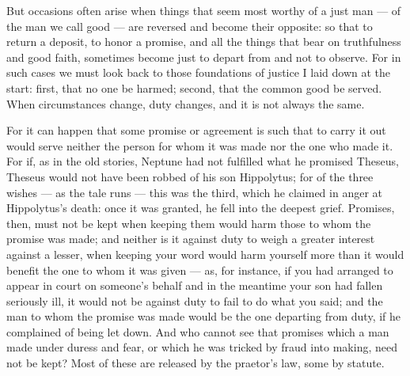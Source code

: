  But occasions often arise when things that seem most worthy of a just man — of the man we call good — are reversed and become their opposite: so that to return a deposit, to honor a promise, and all the things that bear on truthfulness and good faith, sometimes become just to depart from and not to observe. For in such cases we must look back to those foundations of justice I laid down at the start: first, that no one be harmed; second, that the common good be served. When circumstances change, duty changes, and it is not always the same.

 For it can happen that some promise or agreement is such that to carry it out would serve neither the person for whom it was made nor the one who made it. For if, as in the old stories, Neptune had not fulfilled what he promised Theseus, Theseus would not have been robbed of his son Hippolytus; for of the three wishes — as the tale runs — this was the third, which he claimed in anger at Hippolytus's death: once it was granted, he fell into the deepest grief. Promises, then, must not be kept when keeping them would harm those to whom the promise was made; and neither is it against duty to weigh a greater interest against a lesser, when keeping your word would harm yourself more than it would benefit the one to whom it was given — as, for instance, if you had arranged to appear in court on someone's behalf and in the meantime your son had fallen seriously ill, it would not be against duty to fail to do what you said; and the man to whom the promise was made would be the one departing from duty, if he complained of being let down. And who cannot see that promises which a man made under duress and fear, or which he was tricked by fraud into making, need not be kept? Most of these are released by the praetor's law, some by statute.

